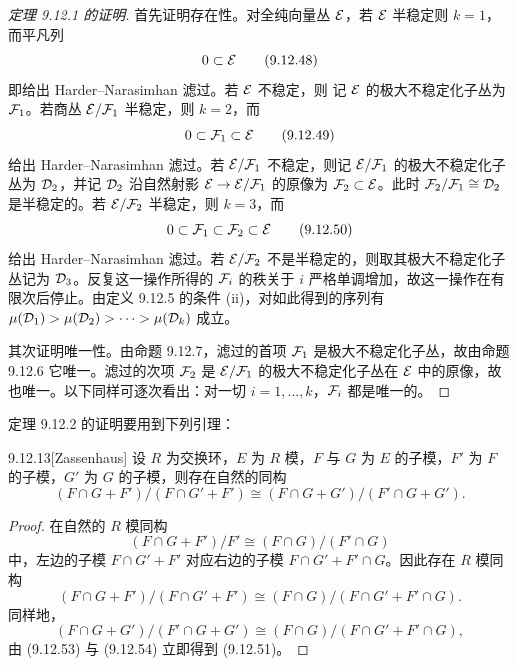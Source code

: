 \begin{proof}[定理 9.12.1 的证明]
  首先证明存在性。对全纯向量丛 $\mathcal{E}$，若 $\mathcal{E}$ 半稳定则 $k=1$，而平凡列
  \begin{equation}
    0\subset\mathcal{E}
    \tag{9.12.48}
  \end{equation}
  即给出 Harder--Narasimhan 滤过。若 $\mathcal{E}$ 不稳定，则
  记 $\mathcal{E}$ 的极大不稳定化子丛为 $\mathcal{F}_1$。若商丛 $\mathcal{E}/\mathcal{F}_1$ 半稳定，则 $k=2$，而
  \begin{equation}
    0\subset\mathcal{F}_1\subset\mathcal{E}
    \tag{9.12.49}
  \end{equation}
  给出 Harder--Narasimhan 滤过。若 $\mathcal{E}/\mathcal{F}_1$ 不稳定，则记 $\mathcal{E}/\mathcal{F}_1$ 的极大不稳定化子丛为 $\mathcal{D}_2$，并记 $\mathcal{D}_2$ 沿自然射影 $\mathcal{E}\to\mathcal{E}/\mathcal{F}_1$ 的原像为 $\mathcal{F}_2\subset\mathcal{E}$。此时 $\mathcal{F}_2/\mathcal{F}_1\cong\mathcal{D}_2$ 是半稳定的。若 $\mathcal{E}/\mathcal{F}_2$ 半稳定，则 $k=3$，而
  \begin{equation}
    0\subset\mathcal{F}_1\subset\mathcal{F}_2\subset\mathcal{E}
    \tag{9.12.50}
  \end{equation}
  给出 Harder--Narasimhan 滤过。若 $\mathcal{E}/\mathcal{F}_2$ 不是半稳定的，则取其极大不稳定化子丛记为 $\mathcal{D}_3$。反复这一操作所得的 $\mathcal{F}_i$ 的秩关于 $i$ 严格单调增加，故这一操作在有限次后停止。由定义 9.12.5 的条件 (ii)，对如此得到的序列有 $\mu(\mathcal{D}_1)>\mu(\mathcal{D}_2)>\cdots>\mu(\mathcal{D}_k)$ 成立。

  其次证明唯一性。由命题 9.12.7，滤过的首项 $\mathcal{F}_1$ 是极大不稳定化子丛，故由命题 9.12.6 它唯一。滤过的次项 $\mathcal{F}_2$ 是 $\mathcal{E}/\mathcal{F}_1$ 的极大不稳定化子丛在 $\mathcal{E}$ 中的原像，故也唯一。以下同样可逐次看出：对一切 $i=1,\dots,k$，$\mathcal{F}_i$ 都是唯一的。
\end{proof}

  定理 9.12.2 的证明要用到下列引理：

\begin{lemma*}{9.12.13}[Zassenhaus]
  设 $R$ 为交换环，$E$ 为 $R$ 模，$F$ 与 $G$ 为 $E$ 的子模，$F'$ 为 $F$ 的子模，$G'$ 为 $G$ 的子模，则存在自然的同构
  \begin{equation}
    (F\cap G+F')/(F\cap G'+F')\cong(F\cap G+G')/(F'\cap G+G').
    \tag{9.12.51}
  \end{equation}
\end{lemma*}
\begin{proof}
  在自然的 $R$ 模同构
  \begin{equation}
    (F\cap G+F')/F'\cong(F\cap G)/(F'\cap G)
    \tag{9.12.52}
  \end{equation}
  中，左边的子模 $F\cap G'+F'$ 对应右边的子模 $F\cap G'+F'\cap G$。因此存在 $R$ 模同构
  \begin{equation}
    (F\cap G+F')/(F\cap G'+F')\cong(F\cap G)/(F\cap G'+F'\cap G).
    \tag{9.12.53}
  \end{equation}
  同样地，
  \begin{equation}
    (F\cap G+G')/(F'\cap G+G')\cong(F\cap G)/(F\cap G'+F'\cap G),
    \tag{9.12.54}
  \end{equation}
  由 (9.12.53) 与 (9.12.54) 立即得到 (9.12.51)。
\end{proof}

